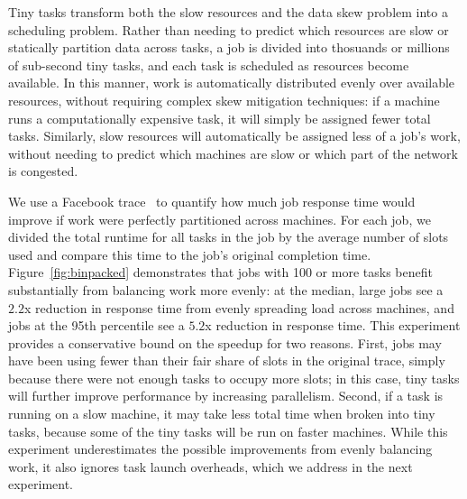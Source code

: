 Tiny tasks transform both the slow resources and the data skew problem
into a scheduling problem.  Rather than needing to predict which resources
are slow or statically partition data across tasks, a job is divided into
thosuands or millions of sub-second tiny tasks, and each task is scheduled
as resources become available.  In this manner, work is automatically
distributed evenly over available resources, without requiring complex skew
mitigation techniques: if a machine runs a computationally expensive task, it
will simply be assigned fewer total tasks.  Similarly, slow resources will
automatically be assigned less of a job's work, without needing to predict which
machines are slow or which part of the network is congested.

We use a Facebook trace~\cite{chen2012interactive} to quantify how much job response time would
improve if work were perfectly partitioned across machines.
For each job, we divided the total runtime for all tasks in the
job by the average number of slots used and compare this time to the job's
original completion time.
Figure~\ref{fig:binpacked}
demonstrates that jobs with 100 or more tasks benefit substantially from
balancing work more evenly: at the median, large jobs see
a $2.2$x reduction in response time from evenly spreading load
across machines, and
jobs at the 95th percentile see a $5.2$x reduction in response time.
This experiment provides a conservative bound on the speedup for two reasons. First, jobs
may have been using fewer than their fair share of slots in the original trace,
simply because there were not enough tasks to occupy more slots; in this case,
tiny tasks will further improve performance by increasing parallelism. Second,
if a task is running on a slow machine, it may take less total time when
broken into tiny tasks, because some of the tiny tasks will be run on faster
machines.
While this experiment underestimates the possible improvements from
evenly balancing work, it also ignores task launch overheads, which
we address in the next experiment.



